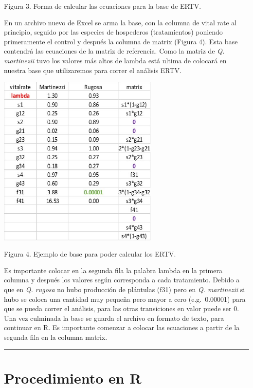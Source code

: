 \documentclass[
]{book}
\theoremstyle{definition}
\theoremstyle{definition}
\theoremstyle{definition}
\theoremstyle{definition}
\theoremstyle{remark}
\begin{document}
Figura 3. Forma de calcular las ecuaciones para la base de ERTV.

En un archivo nuevo de Excel se arma la base, con la columna de vital rate al principio, seguido por las especies de hospederos (tratamientos) poniendo primeramente el control y después la columna de matrix (Figura 4). Esta base contendrá las ecuaciones de la matriz de referencia. Como la matriz de \emph{Q. martinezii} tuvo los valores más altos de lambda está ultima de colocará en nuestra base que utilizaremos para correr el análisis ERTV.

\includegraphics[width=0.6\textwidth,height=\textheight]{Figures/imagen4.jpg}

Figura 4. Ejemplo de base para poder calcular los ERTV.

Es importante colocar en la segunda fila la palabra lambda en la primera columna y después los valores según corresponda a cada tratamiento. Debido a que en \emph{Q. rugosa} no hubo producción de plántulas (f31) pero en \emph{Q. martinezii} si hubo se coloca una cantidad muy pequeña pero mayor a cero (e.g.~0.00001) para que se pueda correr el análisis, para las otras transiciones en valor puede ser 0. Una vez culminada la base se guarda el archivo en formato de texto, para continuar en R. Es importante comenzar a colocar las ecuaciones a partir de la segunda fila en la columna matrix.

\begin{center}\rule{0.5\linewidth}{0.5pt}\end{center}

\section{Procedimiento en R}\label{procedimiento-en-r}
\end{document}
